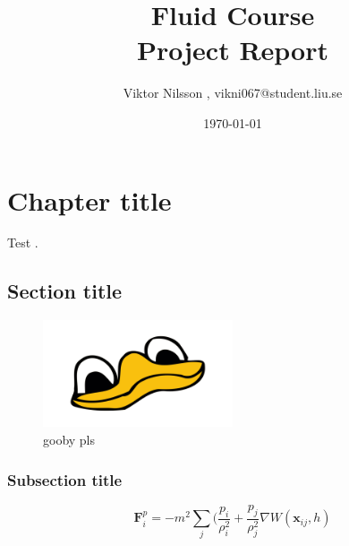 \documentclass[]{report}   %
\begin{document}
\title{Fluid Course\\ Project Report}   %
\author{Viktor Nilsson , vikni067@student.liu.se}

\date{\today}    %
\maketitle

\setcounter{page}{2}

\begin{abstract}
	\lipsum[1]

\end{abstract}

\chapter{Chapter title}
	Test \cite{Bee12}.

	\section{Section title}
		\lipsum[1]
	\begin{figure}[h!]
  		\centering
   		 \includegraphics[width=0.5\textwidth]{f93}
		\caption{gooby pls}
	\end{figure}

	\subsection{Subsection title}
		\lipsum[1]
		\begin{equation}
		\textbf{F}_i^p = -m^2\sum_j (\frac{p_i}{\rho_i^2} + \frac{p_j}{\rho_j^2} \nabla W(\textbf{x}_{ij},h)
		\end{equation}




\end{document}
